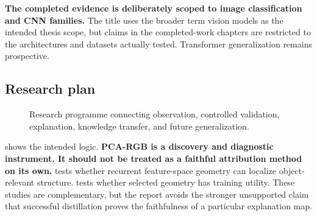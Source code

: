 \textbf{The completed evidence is deliberately scoped to image classification
and CNN families.} The title uses the broader term vision models as the
intended thesis scope, but claims in the completed-work chapters are restricted
to the architectures and datasets actually tested. Transformer generalization
remains prospective.

\subsection{Research plan}

\begin{figure}[H]
    \centering
    
    \caption{Research programme connecting observation, controlled validation,
    explanation, knowledge transfer, and future generalization.}
    \label{fig:research-program}
\end{figure}

 shows the intended logic. \textbf{PCA-RGB is a
discovery and diagnostic instrument. It should not be treated as a faithful
attribution method on its own.} \methodname{} tests whether recurrent
feature-space geometry can localize object-relevant structure. \jmethod{} tests
whether selected geometry has training utility. These studies are
complementary, but the report avoids the stronger unsupported claim that
successful distillation proves the faithfulness of a particular explanation
map.
